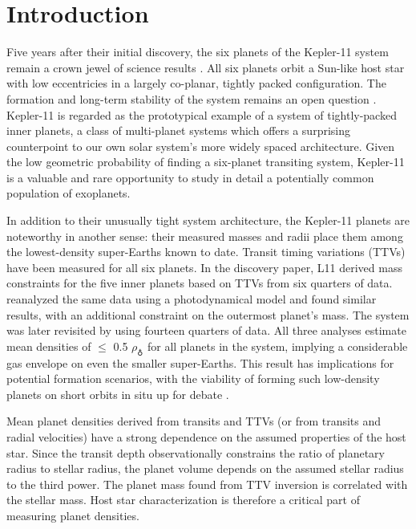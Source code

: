\documentclass[oneside]{emulateapj}
\begin{document}
\section{Introduction}

Five years after their initial discovery, the six planets of the Kepler-11 system remain a crown jewel of \Kepler science results \citep[][hereafter L11]{Lissauer2011}. All six planets orbit a Sun-like host star with low eccentricies in a largely co-planar, tightly packed configuration. The formation and long-term stability of the system remains an open question \citep[see e.g.][]{Ikoma2012, Hands2014, Mahajan2014}. Kepler-11 is regarded as the prototypical example of a system of tightly-packed inner planets, a class of \Kepler multi-planet systems which offers a surprising counterpoint to our own solar system's more widely spaced architecture. Given the low geometric probability of finding a six-planet transiting system, Kepler-11 is a valuable and rare opportunity to study in detail a potentially common population of exoplanets.

In addition to their unusually tight system architecture, the Kepler-11 planets are noteworthy in another sense: their measured masses and radii place them among the lowest-density super-Earths known to date. Transit timing variations (TTVs) have been measured for all six planets. In the discovery paper,  L11 derived mass constraints for the five inner planets based on TTVs from six quarters of \Kepler data. \citet{Migaszewski2012} reanalyzed the same data using a photodynamical model and found similar results, with an additional constraint on the outermost planet's mass. The system was later revisited by \citet[][hereafter L13]{Lissauer2013} using fourteen quarters of \Kepler data. All three analyses estimate mean densities of $\leq$ 0.5 $\rho_{\earth}$ for all planets in the system, implying a considerable gas envelope on even the smaller super-Earths. This result has implications for potential formation scenarios, with the viability of forming such low-density planets on short orbits in situ up for debate \citep[e.g.][]{Lopez2012, Chiang2013, Bodenheimer2014, Howe2015}.

Mean planet densities derived from transits and TTVs (or from transits and radial velocities) have a strong dependence on the assumed properties of the host star. Since the transit depth observationally constrains the ratio of planetary radius to stellar radius, the planet volume depends on the assumed stellar radius to the third power. The planet mass found from TTV inversion is correlated with the stellar mass. Host star characterization is therefore a critical part of measuring planet densities.
\end{document}
